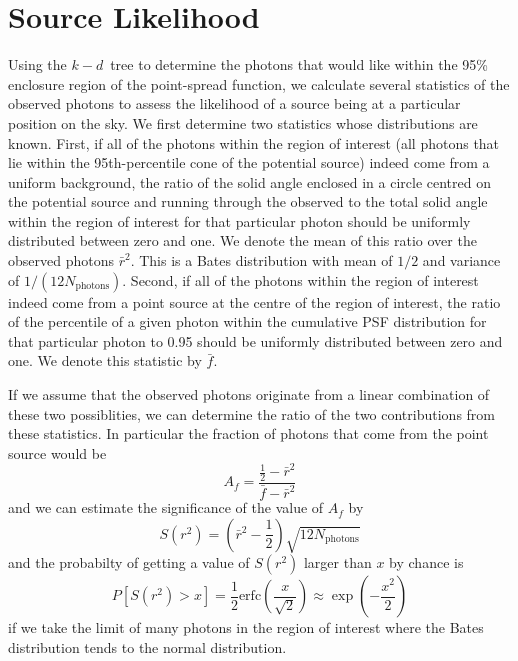 \documentclass[useAMS,usenatbib]{mn2e}
\begin{document}
\section{Source Likelihood}
\label{sec:source-likelihood}

Using the $k-d$~tree to determine the photons that would like within
the 95\% enclosure region of the point-spread function, we calculate
several statistics of the observed photons to assess the likelihood of
a source being at a particular position on the sky.  We first
determine two statistics whose distributions are known. First, if all
of the photons within the region of interest (all photons that lie
within the 95th-percentile cone of the potential source) indeed come
from a uniform background, the ratio of the solid angle enclosed in a
circle centred on the potential source and running through the
observed to the total solid angle within the region of interest for
that particular photon should be uniformly distributed between zero
and one.  We denote the mean of this ratio over the observed photons
$\bar r^2$.  This is a Bates distribution with mean of $1/2$ and
variance of $1/(12 N_\mathrm{photons})$.  Second, if all of the photons within the
region of interest indeed come from a point source at the centre of
the region of interest, the ratio of the percentile of a given photon
within the cumulative PSF distribution for that particular photon to
0.95 should be uniformly distributed between zero and one.  We denote
this statistic by $\bar f$.

If we assume that the observed photons originate from a linear
combination of these two possiblities, we can determine the ratio of
the two contributions from these statistics. In particular the fraction
of photons that come from the point source would be
\begin{equation}
  A_f=\frac{\frac{1}{2}-\bar r^2}{\bar f-\bar r^2}
  \label{eq:1}
\end{equation}
and we can estimate the significance of the value of $A_f$ by
\begin{equation}
  S(r^2) = \left ( \bar r^2-\frac{1}{2} \right ) \sqrt{12 N_\mathrm{photons}}
\label{eq:2}
\end{equation}
and the probabilty of getting a value of $S(r^2)$ larger than $x$ by
chance is
\begin{equation}
  P\left [ S(r^2) > x \right ] = \frac{1}{2} \mathrm{erfc} \left ( \frac{x}{\sqrt{2}} \right
  ) \approx \exp \left (-\frac{x^2}{2} \right )
  \label{eq:3}
\end{equation}
if we take the limit of many photons in the region of interest where
the Bates distribution tends to the normal distribution.  
\end{document}
